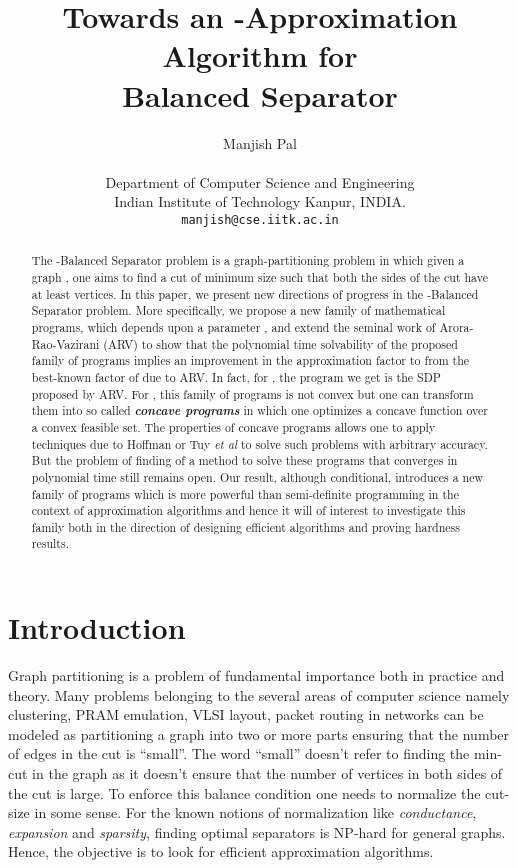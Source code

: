 \documentclass [11pt,a4paper]{article}
\title{
	\textbf{ \Large Towards an -Approximation Algorithm for \\ {\sc Balanced Separator}}
}
\author{	\large{ Manjish Pal}\\\\
  \small{ Department of Computer Science and Engineering }\\
	\small{ Indian Institute of Technology Kanpur, INDIA. } \\
	\small{{\tt manjish@cse.iitk.ac.in}}\\
}
\date{}
\begin{document}
\pagestyle{empty}

\maketitle

\thispagestyle{empty}

\begin{abstract}
The {\sc -Balanced Separator} problem is a graph-partitioning problem in which given a graph 
, one aims to find a cut of minimum size such that both the sides of the cut
have at least  vertices. In this paper, we present new directions of progress in the {\sc -Balanced Separator} problem. 
More specifically, we propose a new family of mathematical programs, 
which depends upon a parameter , and extend
the seminal work of Arora-Rao-Vazirani ({\sf ARV}) \cite{ARV} to show that the polynomial time solvability 
of the proposed family of programs implies an improvement in the approximation factor
to  from the best-known factor of  due to {\sf ARV}.
In fact, for , the program we get is the SDP proposed by {\sf ARV}.
For , this family of programs is not convex but one can transform them 
into so called \emph{\textbf{concave programs}} in which one optimizes a concave function over a convex feasible set. 
The properties of concave programs allows one to apply techniques due to Hoffman \cite{H81} or Tuy \emph{et al} \cite{TTT85} 
to solve such problems with arbitrary accuracy. But the problem of finding of a method to solve these programs 
that converges in polynomial time still remains open. Our result, although conditional, 
introduces a new family of programs which is more powerful than semi-definite programming 
in the context of approximation algorithms and hence it will of interest to investigate 
this family both in the direction of designing efficient algorithms and proving hardness results.
\end{abstract}

\newpage

\section{Introduction}
Graph partitioning is a problem of fundamental importance both in practice and theory. Many problems belonging 
to the several areas of computer science namely clustering, PRAM emulation, VLSI layout, packet routing in networks
can be modeled as partitioning a graph into two or more parts ensuring that the number of edges in the cut is ``small''. The word ``small'' doesn't refer to finding the min-cut in the graph as it doesn't ensure that the number of vertices in both sides of the cut is large. To enforce this balance condition one needs to normalize the cut-size in some sense. For the known notions of normalization like \emph{conductance}, \emph{expansion} and \emph{sparsity}, finding optimal separators is NP-hard for general graphs. Hence, the objective 
is to look for efficient approximation algorithms. 
\end{document}
